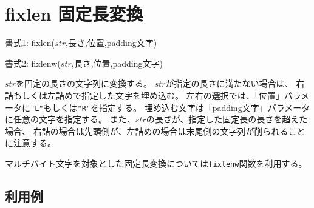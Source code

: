 
%

\section{fixlen 固定長変換\label{sect:fixlen}}

書式1: fixlen($str$,長さ,位置,padding文字)

書式2: fixlenw($str$,長さ,位置,padding文字)

$str$を固定の長さの文字列に変換する。
$str$が指定の長さに満たない場合は、
右詰もしくは左詰めで指定した文字を埋め込む。
左右の選択では、「位置」パラメータに\verb|"L"|もしくは\verb|"R"|を指定する。
埋め込む文字は「padding文字」パラメータに任意の文字を指定する。
また、$str$の長さが、指定した固定長の長さを超えた場合、
右詰の場合は先頭側が、左詰めの場合は末尾側の文字列が削られることに注意する。

マルチバイト文字を対象とした固定長変換については\verb|fixlenw|関数を利用する。

\subsection*{利用例}


%

